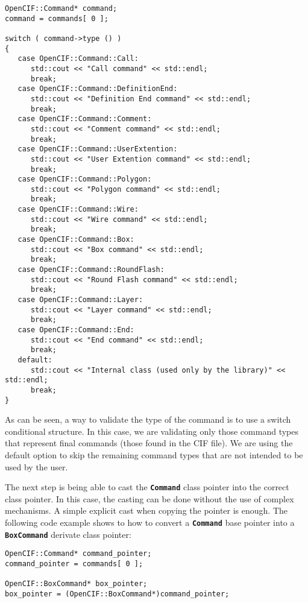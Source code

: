 \documentclass[11pt,twoside,openany,x11names,svgnames]{memoir}
\begin{document}
\begin{lstlisting}[frame=single,style=CPPStyle]
OpenCIF::Command* command;
command = commands[ 0 ];

switch ( command->type () )
{
   case OpenCIF::Command::Call:
      std::cout << "Call command" << std::endl;
      break;
   case OpenCIF::Command::DefinitionEnd:
      std::cout << "Definition End command" << std::endl;
      break;
   case OpenCIF::Command::Comment:
      std::cout << "Comment command" << std::endl;
      break;
   case OpenCIF::Command::UserExtention:
      std::cout << "User Extention command" << std::endl;
      break;
   case OpenCIF::Command::Polygon:
      std::cout << "Polygon command" << std::endl;
      break;
   case OpenCIF::Command::Wire:
      std::cout << "Wire command" << std::endl;
      break;
   case OpenCIF::Command::Box:
      std::cout << "Box command" << std::endl;
      break;
   case OpenCIF::Command::RoundFlash:
      std::cout << "Round Flash command" << std::endl;
      break;
   case OpenCIF::Command::Layer:
      std::cout << "Layer command" << std::endl;
      break;
   case OpenCIF::Command::End:
      std::cout << "End command" << std::endl;
      break;
   default:
      std::cout << "Internal class (used only by the library)" << std::endl;
      break;
}
\end{lstlisting}

As can be seen, a way to validate the type of the command is to use a switch conditional structure. In this case, we are validating only those command types that represent final commands (those found in the CIF file). We are using the default option to skip the remaining command types that are not intended to be used by the user.

The next step is being able to cast the \textbf{\texttt{Command}} class pointer into the correct class pointer. In this case, the casting can be done without the use of complex mechanisms. A simple explicit cast when copying the pointer is enough. The following code example shows to how to convert a \textbf{\texttt{Command}} base pointer into a \textbf{\texttt{BoxCommand}} derivate class pointer:

\begin{lstlisting}[frame=single,style=CPPStyle]
OpenCIF::Command* command_pointer;
command_pointer = commands[ 0 ];

OpenCIF::BoxCommand* box_pointer;
box_pointer = (OpenCIF::BoxCommand*)command_pointer;
\end{lstlisting}
\end{document}

